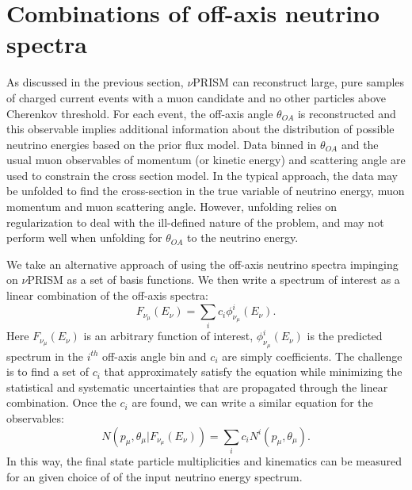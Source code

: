 
\section{Combinations of off-axis neutrino spectra }
\label{sec:combos}


As discussed in the previous section, $\nu$PRISM can reconstruct large, pure samples of charged current
events with a muon candidate and no other particles above Cherenkov threshold.  For each event, the
off-axis angle $\theta_{OA}$ is reconstructed and this observable implies additional information about the
distribution of possible neutrino energies based on the prior flux model.  Data binned in $\theta_{OA}$ and the
usual muon observables of momentum (or kinetic energy) and scattering angle are used to constrain the
cross section model.  In the typical approach, the data may be unfolded to find the cross-section in the
true variable of neutrino energy, muon momentum  and muon scattering angle.  However, unfolding relies 
on regularization to deal with the ill-defined nature of the problem, and may not perform well when 
unfolding for $\theta_{OA}$ to the neutrino energy.

We take an alternative approach of using the off-axis neutrino spectra impinging on $\nu$PRISM as a set of basis
functions.  We then write a spectrum of interest as a linear combination of the off-axis spectra:
\begin{equation}
F_{\nu_{\mu}}(E_{\nu}) = \sum_{i} c_{i}\phi^{i}_{\nu_{\mu}}(E_{\nu}).
\end{equation}
Here $F_{\nu_{\mu}}(E_{\nu})$ is an arbitrary function of interest, $\phi^{i}_{\nu_{\mu}}(E_{\nu})$ is the predicted spectrum
in the $i^{th}$ off-axis angle bin and $c_{i}$ are simply coefficients.  The challenge is to find a set of $c_{i}$
that approximately satisfy the equation while minimizing the statistical and systematic uncertainties that are propagated through the
linear combination.  Once the $c_{i}$ are found, we can write a similar equation for the observables:
\begin{equation}
N(p_{\mu},\theta_{\mu}|F_{\nu_{\mu}}(E_{\nu})) = \sum_{i} c_{i}N^{i}(p_{\mu},\theta_{\mu}).
\end{equation}
In this way, the final state particle multiplicities and kinematics can be measured for an given choice of 
of the input neutrino energy spectrum.  


